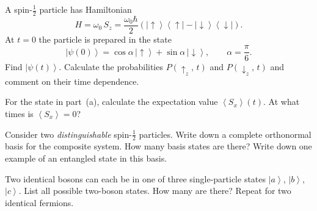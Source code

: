 \documentclass[12pt,a4paper]{article}
\renewcommand{\ket}[1]{\left|#1\right\rangle}
\renewcommand{\ketbra}[2]{\left|#1\right\rangle\!\left\langle #2\right|}
\renewcommand{\expect}[1]{\left\langle #1\right\rangle}
\begin{document}
\begin{parts}
\item A spin-$\tfrac{1}{2}$ particle has Hamiltonian
\[
H = \omega_0\,S_z = \frac{\omega_0\hbar}{2}\left(\ketbra{\!\uparrow}{\uparrow\!} - \ketbra{\!\downarrow}{\downarrow\!}\right).
\]
At $t = 0$ the particle is prepared in the state
\[
\ket{\psi(0)} = \cos\alpha\,\ket{\!\uparrow} + \sin\alpha\,\ket{\!\downarrow}, \qquad \alpha = \frac{\pi}{6}.
\]
Find $\ket{\psi(t)}$. Calculate the probabilities $P(\uparrow_z,\,t)$ and $P(\downarrow_z,\,t)$ and comment on their time dependence. 

\item For the state in part~(a), calculate the expectation value $\expect{S_x}(t)$. At what times is $\expect{S_x} = 0$? 

\item Consider two \emph{distinguishable} spin-$\tfrac{1}{2}$ particles. Write down a complete orthonormal basis for the composite system. How many basis states are there? Write down one example of an entangled state in this basis. 

\item Two identical bosons can each be in one of three single-particle states $\ket{a}$, $\ket{b}$, $\ket{c}$. List all possible two-boson states. How many are there? Repeat for two identical fermions. 
\end{parts}

\newpage


\end{document}
